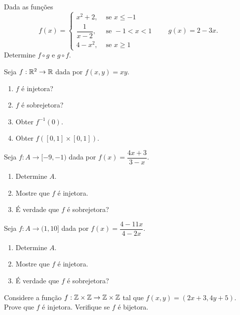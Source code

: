 \documentclass[12pt]{exam}
\begin{document}
\vspace{.3cm}

\questao Dada as fun\c{c}\~oes
\[
	f(x) = \begin{cases}
		x^2 + 2, & \mbox{ se } x \le -1\\
		\dfrac{1}{x - 2}, & \mbox{ se } -1 < x < 1\\
		4 - x^2, & \mbox{ se } x \ge 1
	\end{cases} \qquad g(x) = 2 - 3x.
\]
Determine $f\circ g$ e $g \circ f$.

\vspace{.3cm}

\questao Seja $f: \mathbb{R}^2 \to \mathbb{R}$ dada por $f(x,y) = xy$.
\begin{enumerate}[label={\alph*})]
	\item $f$ {\'e} injetora?
	\item $f$ {\'e} sobrejetora?
	\item Obter $f^{-1}({0})$.
	\item Obter $f([0,1]\times [0,1])$.
\end{enumerate}

\vspace{.3cm}

\questao Seja $f : A \to [-9,-1)$ dada por $f(x) = \dfrac{4x + 3}{3 - x}$.
\begin{enumerate}[label={\alph*})]
	\item Determine $A$.
	\item Mostre que $f$ \'e injetora.
	\item \'E verdade que $f$ \'e sobrejetora?
\end{enumerate}

\vspace{.3cm}

\questao Seja $f : A \to (1,10]$ dada por $f(x) = \dfrac{4 - 11x}{4 - 2x}$.
\begin{enumerate}[label={\alph*})]
	\item Determine $A$.
	\item Mostre que $f$ \'e injetora.
	\item \'E verdade que $f$ \'e sobrejetora?
\end{enumerate}

\vspace{.3cm}

\questao Considere a fun{\c c}{\~a}o $f : \mathbb{Z} \times \mathbb{Z} \to \mathbb{Z} \times \mathbb{Z}$ tal que $f(x,y) = (2x + 3, 4y + 5)$. Prove que $f$ {\'e} injetora. Verifique se $f$ {\'e} bijetora.

\vspace{.3cm}
\end{document}
